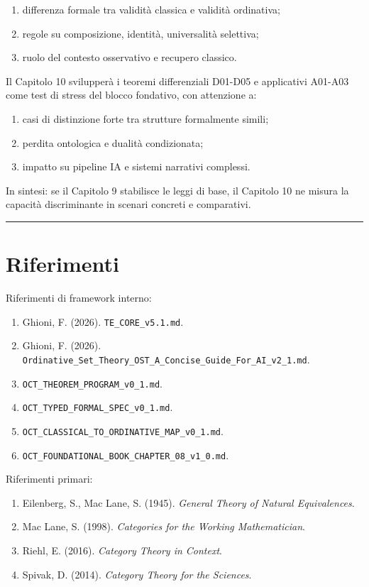 \begin{enumerate}
\def\labelenumi{\arabic{enumi}.}
\tightlist
\item
  differenza formale tra validità classica e validità ordinativa;
\item
  regole su composizione, identità, universalità selettiva;
\item
  ruolo del contesto osservativo e recupero classico.
\end{enumerate}

Il Capitolo 10 svilupperà i teoremi differenziali D01-D05 e applicativi A01-A03 come test di stress del blocco fondativo, con attenzione a:

\begin{enumerate}
\def\labelenumi{\arabic{enumi}.}
\tightlist
\item
  casi di distinzione forte tra strutture formalmente simili;
\item
  perdita ontologica e dualità condizionata;
\item
  impatto su pipeline IA e sistemi narrativi complessi.
\end{enumerate}

In sintesi: se il Capitolo 9 stabilisce le leggi di base, il Capitolo 10 ne misura la capacità discriminante in scenari concreti e comparativi.

\begin{center}\rule{0.5\linewidth}{0.5pt}\end{center}

\section{Riferimenti}

Riferimenti di framework interno:

\begin{enumerate}
\def\labelenumi{\arabic{enumi}.}
\tightlist
\item
  Ghioni, F. (2026). \texttt{TE\_CORE\_v5.1.md}.
\item
  Ghioni, F. (2026). \texttt{Ordinative\_Set\_Theory\_OST\_A\_Concise\_Guide\_For\_AI\_v2\_1.md}.
\item
  \texttt{OCT\_THEOREM\_PROGRAM\_v0\_1.md}.
\item
  \texttt{OCT\_TYPED\_FORMAL\_SPEC\_v0\_1.md}.
\item
  \texttt{OCT\_CLASSICAL\_TO\_ORDINATIVE\_MAP\_v0\_1.md}.
\item
  \texttt{OCT\_FOUNDATIONAL\_BOOK\_CHAPTER\_08\_v1\_0.md}.
\end{enumerate}

Riferimenti primari:

\begin{enumerate}
\def\labelenumi{\arabic{enumi}.}
\tightlist
\item
  Eilenberg, S., Mac Lane, S. (1945). \emph{General Theory of Natural Equivalences}.
\item
  Mac Lane, S. (1998). \emph{Categories for the Working Mathematician}.
\item
  Riehl, E. (2016). \emph{Category Theory in Context}.
\item
  Spivak, D. (2014). \emph{Category Theory for the Sciences}.
\end{enumerate}
